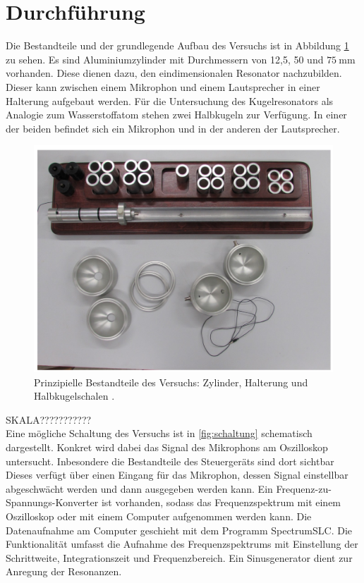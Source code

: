 \section{Durchführung}
\label{sec:Durchführung}
Die Bestandteile und der grundlegende Aufbau des Versuchs ist in Abbildung \ref{fig:grundlegenderAufbau} zu sehen. Es sind Aluminiumzylinder mit Durchmessern von 12,5, 50 und $\SI{75}{\milli\meter}$ vorhanden. Diese dienen dazu, den eindimensionalen Resonator nachzubilden. Dieser kann zwischen einem Mikrophon und einem Lautsprecher in einer Halterung aufgebaut werden. Für die Untersuchung des Kugelresonators als Analogie zum Wasserstoffatom stehen zwei Halbkugeln zur Verfügung. In einer der beiden befindet sich ein Mikrophon und in der anderen der Lautsprecher.\\

\begin{figure}
  \centering
  \includegraphics[width=\textwidth]{data/aufbau.png}
  \caption{Prinzipielle Bestandteile des Versuchs: Zylinder, Halterung und Halbkugelschalen \cite{Versuchsanleitung}.}
  \label{fig:grundlegenderAufbau}
\end{figure}

SKALA???????????\\
Eine mögliche Schaltung des Versuchs ist in \ref{fig:schaltung} schematisch dargestellt. Konkret wird dabei das Signal des Mikrophons am Oszilloskop untersucht. Inbesondere die Bestandteile des Steuergeräts sind dort sichtbar
Dieses verfügt über einen Eingang für das Mikrophon, dessen Signal einstellbar abgeschwächt werden und dann ausgegeben werden kann. Ein Frequenz-zu-Spannungs-Konverter ist vorhanden, sodass das Frequenzspektrum mit einem Oszilloskop oder mit einem Computer aufgenommen werden kann. Die Datenaufnahme am Computer geschieht mit dem Programm SpectrumSLC. Die Funktionalität umfasst die Aufnahme des Frequenzspektrums mit Einstellung der Schrittweite, Integrationszeit und Frequenzbereich. Ein Sinusgenerator dient zur Anregung der Resonanzen.\\

